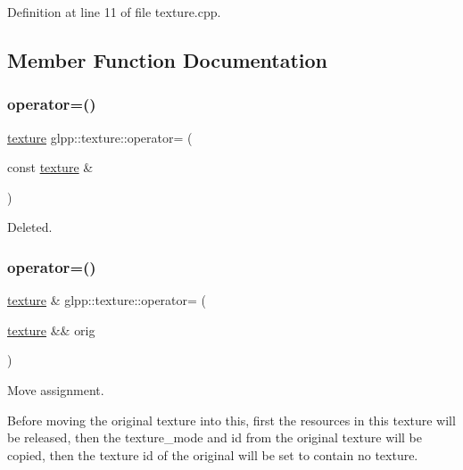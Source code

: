 Definition at line 11 of file texture.\+cpp.



\subsection{Member Function Documentation}
\mbox{\label{classglpp_1_1texture_a4b57f18cf8ee0240acf75cd573ced480}} 
\subsubsection{\texorpdfstring{operator=()}{operator=()}\hspace{0.1cm}{\footnotesize\ttfamily [1/2]}}
{\footnotesize\ttfamily \hyperlink{classglpp_1_1texture}{texture} glpp\+::texture\+::operator= (\begin{DoxyParamCaption}\item[{const \hyperlink{classglpp_1_1texture}{texture} \&}]{ }\end{DoxyParamCaption})\hspace{0.3cm}{\ttfamily [delete]}}

Deleted. \mbox{\label{classglpp_1_1texture_a459d035c1f00aa3e83ed381515779b4a}} 
\subsubsection{\texorpdfstring{operator=()}{operator=()}\hspace{0.1cm}{\footnotesize\ttfamily [2/2]}}
{\footnotesize\ttfamily \hyperlink{classglpp_1_1texture}{texture} \& glpp\+::texture\+::operator= (\begin{DoxyParamCaption}\item[{\hyperlink{classglpp_1_1texture}{texture} \&\&}]{orig }\end{DoxyParamCaption})\hspace{0.3cm}{\ttfamily [noexcept]}}



Move assignment. 

Before moving the original texture into this, first the resources in this texture will be released, then the texture\+\_\+mode and id from the original texture will be copied, then the texture id of the original will be set to contain no texture.


